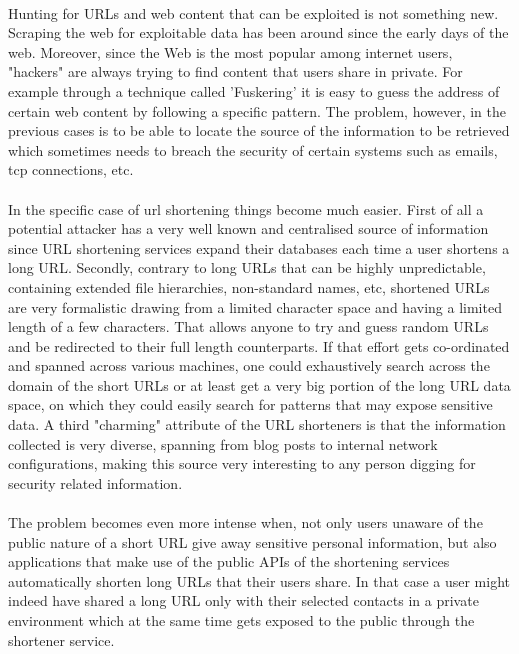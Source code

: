 \documentclass[12pt]{article}
\begin{document}
\paragraph{}
Hunting for URLs and web content that can be exploited is not something new. Scraping the web for exploitable data has been around since the early days of the web. Moreover, since the Web is the most popular among internet users, "hackers" are always trying to find content that users share in private. For example through a technique called 'Fuskering' it is easy to guess the address of certain web content by following a specific pattern. The problem, however, in the previous cases  is to be able to locate the source of the information to be retrieved which sometimes needs to breach the security of certain systems such as emails, tcp connections, etc.
\paragraph{}
In the specific case of url shortening things become much easier. First of all a potential attacker has a very well known and centralised source of information since URL shortening services expand their databases each time a user shortens a long URL. Secondly, contrary to long URLs that can be highly unpredictable, containing extended file hierarchies, non-standard names, etc, shortened URLs are very formalistic drawing from a limited character space and having a limited length of a few characters. That allows anyone to try and guess random URLs and be redirected to their full length counterparts. If that effort gets co-ordinated and spanned across various machines, one could exhaustively search across the domain of the short URLs or at least get a very big portion of the long URL data space, on which they could easily search for patterns that may expose sensitive data. A third "charming" attribute of the URL shorteners is that the information collected is very diverse, spanning from blog posts to internal network configurations, making this source very interesting to any person digging for security related information. 
\paragraph{}
The problem becomes even more intense when, not only users unaware of the public nature of a short URL give away sensitive personal information, but also applications that make use of the public APIs of the shortening services automatically shorten long URLs that their users share. In that case a user might indeed have shared a long URL only with their selected contacts in a private environment which at the same time gets exposed to the public through the shortener service. 
\end{document}
